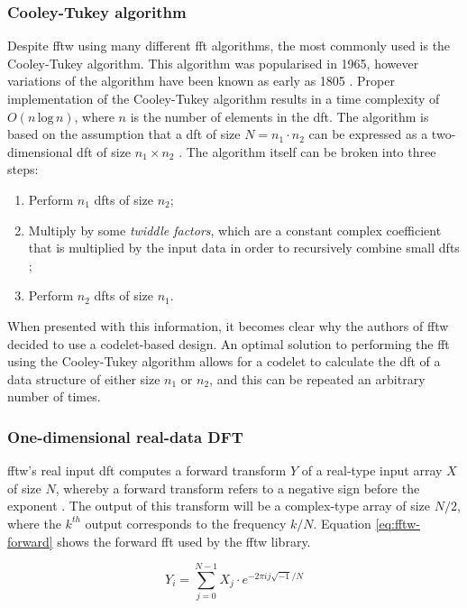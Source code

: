 \documentclass[a4paper,11pt]{report}
\begin{document}
\subsubsection{Cooley-Tukey algorithm}
Despite \gls{fftw} using many different \gls{fft} algorithms, the most commonly used is the Cooley-Tukey algorithm. This algorithm was popularised in 1965, however variations of the algorithm have been known as early as 1805 \cite{cooley1965algorithm, heideman1985gauss}. Proper implementation of the Cooley-Tukey algorithm results in a time complexity of $O(n\, \textrm{log}\, n)$, where $n$ is the number of elements in the \gls{dft}. The algorithm is based on the assumption that a \gls{dft} of size $N = n_{1} \cdot n_{2}$ can be expressed as a two-dimensional \gls{dft} of size $n_{1} \times n_{2}$ \cite{frigo2005design}. The algorithm itself can be broken into three steps: 

\begin{enumerate}
	\item Perform $n_{1}$ \gls{dft}s of size $n_{2}$;
	\item Multiply by some \textit{twiddle factors}, which are a constant complex coefficient that is multiplied by the input data in order to recursively combine small \gls{dft}s \cite{gentleman1966fast};
	\item Perform $n_{2}$ \gls{dft}s of size $n_{1}$.
\end{enumerate}

When presented with this information, it becomes clear why the authors of \gls{fftw} decided to use a codelet-based design. An optimal solution to performing the \gls{fft} using the Cooley-Tukey algorithm allows for a codelet to calculate the \gls{dft} of a data structure of either size $n_{1}$ or $n_{2}$, and this can be repeated an arbitrary number of times.

\subsubsection{One-dimensional real-data DFT}
\gls{fftw}'s real input \gls{dft} computes a forward transform $Y$ of a real-type input array $X$ of size $N$, whereby a forward transform refers to a negative sign before the exponent \cite{frigo2005design}. The output of this transform will be a complex-type array of size $N/2$, where the $k^{th}$ output corresponds to the frequency $k/N$. Equation \ref{eq:fftw-forward} shows the forward \gls{fft} used by the \gls{fftw} library.

\begin{equation}
Y _ { i } = \sum _ { j = 0 } ^ { N - 1 } X _ { j } \cdot e ^ { - 2 \pi i j \sqrt { - 1 } / N }
\label{eq:fftw-forward}
\end{equation}
\end{document}

